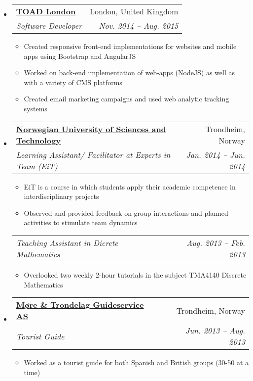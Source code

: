 \documentclass[letterpaper,11pt]{article}
\makeatletter
\newcommand{\resitem}[1]{\item #1 \vspace{-2pt}}
\newcommand{\ressubheading}[4]{
\begin{tabular*}{6.5in}{l@{\extracolsep{\fill}}r}
        \textbf{#1} & #2 \\
        \textit{#3} & \textit{#4} \\
\end{tabular*}\vspace{-6pt}}
\newcommand{\ressubsubheading}[2]{
\begin{tabular*}{6.5in}{l@{\extracolsep{\fill}}r}
        \textit{#1} & \textit{#2} \\
\end{tabular*}\vspace{-6pt}}
\makeatother
\begin{document}
    \begin{itemize}
        \item
            \ressubheading{\href{http://www.toadlondon.com/}{TOAD London}}{London, United Kingdom}{Software Developer}{Nov. 2014 -- Aug. 2015}
                { \footnotesize
                \begin{itemize}
                    \resitem{Created responsive front-end implementations for websites and mobile apps using Bootstrap and AngularJS}
                    \resitem{Worked on back-end implementation of web-apps (NodeJS) as well as with a variety of CMS platforms}
                    \resitem{Created email marketing campaigns and used web analytic tracking systems}
                \end{itemize}
                }
        \item
            \ressubheading{\href{http://www.ntnu.edu/studies/mtiot}{Norwegian University of Sciences and Technology}}{Trondheim, Norway}
                {Learning Assistant/ Facilitator at Experts in Team (EiT)}{Jan. 2014 -- Jun. 2014}
                { \footnotesize
                \begin{itemize}
                    \resitem{EiT is a course in which students apply their academic competence in interdisciplinary projects}
                    \resitem{Observed and provided feedback on group interactions and planned activities to stimulate team dynamics}
                \end{itemize}
                }

            \ressubsubheading{Teaching Assistant in Dicrete Mathematics}{Aug. 2013 -- Feb. 2013}
                { \footnotesize
                \begin{itemize}
                    \resitem{Overlooked two weekly 2-hour tutorials in the subject TMA4140 Discrete Mathematics}
                \end{itemize}
                }

        \item
            \ressubheading{\href{http://www.moereguide.com/}{M{\o}re \& Trondelag Guideservice AS}}{Trondheim, Norway}{Tourist Guide}{Jun. 2013 -- Aug. 2013}
                { \footnotesize
                \begin{itemize}
                    \resitem{Worked as a tourist guide for both Spanish and British groups (30-50 at a time)}
                \end{itemize}
                }

    \end{itemize}  %
\end{document}
